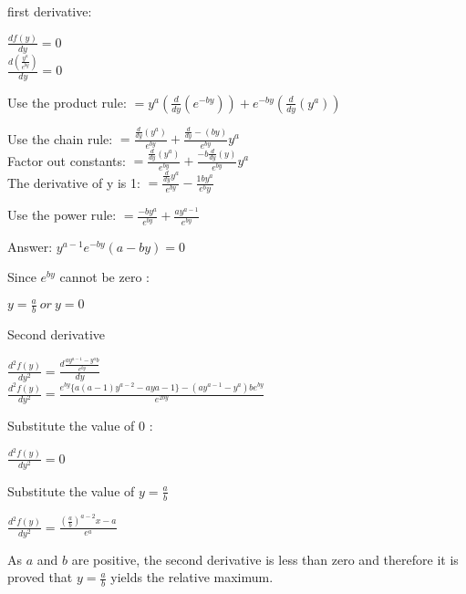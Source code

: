 \documentclass[]{article}
\begin{document}
first derivative:

\(\frac{df(y)}{dy} = 0\)\\
\(\frac{d(\frac{y^a}{e^{by}})}{dy} = 0\)

Use the product rule:
\(= y^{a}(\frac{d}{dy}(e^{-by})) + e^{-by}(\frac{d}{dy}(y^{a}))\)

Use the chain rule:
\(= \frac{\frac{d}{dy}(y^a)}{e^{by}}+\frac{\frac{d}{dy}-(by)}{e^{by}} y^a\)\\
Factor out constants:
\(= \frac{\frac{d}{dy}(y^a)}{e^{by}} + \frac{-b\frac{d}{dy}(y)}{e^{by}}y^a\)\\
The derivative of y is 1:
\(= \frac{\frac{d}{dy}y^a}{e^{by}}-\frac{1 b y^a}{e^by}\)

Use the power rule:
\(= \frac{-b y^a}{e^{by}} + \frac{a y^{a-1}}{e^{by}}\)

Answer: \(y^{a-1}e^{-by}(a-by)=0\)

Since \(e^{by}\) cannot be zero :

\(y = \frac{a}{b}~or~y =0\)

Second derivative

\(\frac{d^2f(y)}{dy^2} = \frac{d\frac{ay^{a-1}-y^ab}{e^{by}}}{dy}\)\\
\(\frac{d^2f(y)}{dy^2} = \frac{e^{by}\{a(a-1)y^{a-2}-ay{a-1}\}-(ay^{a-1}-y^a)be^{by}}{e^{2by}}\)

Substitute the value of 0 :

\(\frac{d^2f(y)}{dy^2} = 0\)

Substitute the value of \(y=\frac{a}{b}\)

\(\frac{d^2f(y)}{dy^2} = \frac{(\frac{a}{b})^{a-2}x-a}{e^a}\)

As \(a\) and \(b\) are positive, the second derivative is less than zero
and therefore it is proved that \(y=\frac{a}{b}\) yields the relative
maximum.
\end{document}
